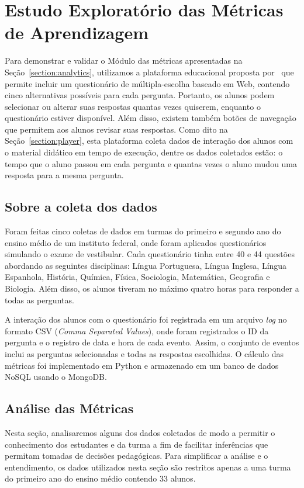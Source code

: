 \section{Estudo Exploratório das Métricas de Aprendizagem}\label{sec:resultados_analytics}
Para demonstrar e validar o Módulo das métricas apresentadas na Seção~\ref{section:analytics}, utilizamos a plataforma educacional proposta por~\cite{leitao:2017} que permite incluir um questionário de múltipla-escolha baseado em Web, contendo cinco alternativas possíveis para cada pergunta. Portanto, os alunos podem selecionar ou alterar suas respostas quantas vezes quiserem, enquanto o questionário estiver disponível. Além disso, existem também botões de navegação que permitem aos alunos revisar suas respostas. Como dito na Seção~\ref{section:player}, esta plataforma coleta dados de interação dos alunos com o material didático em tempo de execução, dentre os dados coletados estão: o tempo que o aluno passou em cada pergunta e quantas vezes o aluno mudou uma resposta para a mesma pergunta. 

\subsection{Sobre a coleta dos dados}
Foram feitas cinco coletas de dados em turmas do primeiro e segundo ano do ensino médio de um instituto federal, onde foram aplicados questionários simulando o exame de vestibular. Cada questionário tinha entre 40 e 44 questões abordando as seguintes disciplinas: Língua Portuguesa, Língua Inglesa, Língua Espanhola, História, Química, Física, Sociologia, Matemática, Geografia e Biologia. Além disso, os alunos tiveram no máximo quatro horas para responder a todas as perguntas.

A interação dos alunos com o questionário foi registrada em um arquivo {\it log} no formato CSV (\textit{Comma Separated Values}), onde foram registrados o ID da pergunta e o registro de data e hora de cada evento. Assim, o conjunto de eventos inclui as perguntas selecionadas e todas as respostas escolhidas. O cálculo das métricas foi implementado em Python e armazenado em um banco de dados NoSQL usando o MongoDB.

\subsection{Análise das Métricas}
\label{subsection:class_analysis}

Nesta seção, analisaremos alguns dos dados coletados de modo a permitir o conhecimento dos estudantes e da turma a fim de facilitar inferências que permitam tomadas de decisões pedagógicas. Para simplificar a análise e o entendimento, os dados utilizados nesta seção são restritos apenas a uma turma do primeiro ano do ensino médio contendo 33 alunos.

